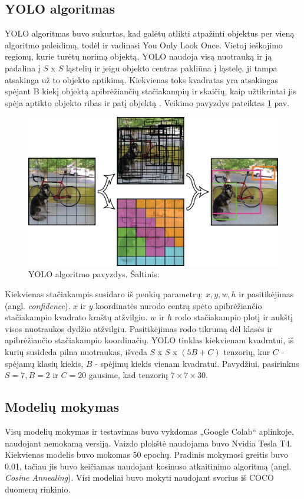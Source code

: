 \documentclass{VUMIFPSkursinis}
\begin{document}
\subsection{YOLO algoritmas}
YOLO algoritmas buvo sukurtas, kad galėtų atlikti atpažinti objektus per vieną algoritmo paleidimą, todėl ir vadinasi You Only Look Once. Vietoj ieškojimo regionų, kurie turėtų norimą objektą, YOLO naudoja visą nuotrauką ir ją padalina į $S$ x $S$ ląstelių ir jeigu objekto centras pakliūna į ląstelę, ji tampa atsakinga už to objekto aptikimą. Kiekvienas toks kvadratas yra atsakingas spėjant B kiekį objektą apibrėžiančių stačiakampių ir skaičių, kaip užtikrintai jis spėja aptikto objekto ribas ir patį objektą \cite{redmon2015you}. Veikimo pavyzdys pateiktas \ref{img:yoloalg.png} pav. 

\begin{figure}[H]
    \centering
    \includegraphics[width=1\textwidth]{img/yolo_algo.png}
    \caption{YOLO algoritmo pavyzdys. Šaltinis: \cite{redmon2015you}}
    \label{img:yoloalg.png}
\end{figure}

Kiekvienas stačiakampis susidaro iš penkių parametrų: $x, y, w, h$ ir pasitikėjimas (angl. \emph{confidence}). $x$ ir $y$ koordinatės nurodo centrą spėto apibrėžiančio stačiakampio kvadrato kraštų atžvilgiu. $w$ ir $h$ rodo stačiakampio plotį ir aukštį visos nuotraukos dydžio atžvilgiu. Pasitikėjimas rodo tikrumą dėl klasės ir apibrėžiančio stačiakampio koordinačių. YOLO tinklas kiekvienam kvadratui, iš kurių susideda pilna nuotraukas, išveda $S$ x $S$ x $(5B + C)$ tenzorių, kur $C$ - spėjamų klasių kiekis, $B$ - spėjimų kiekis vienam kvadratui. Pavydžiui, pasirinkus $S = 7, B = 2$ ir $C = 20$ gausime, kad tenzorių $7 × 7 × 30$.

\subsection{Modelių mokymas}
Visų modelių mokymas ir testavimas buvo vykdomas „Google Colab“ aplinkoje, naudojant nemokamą versiją. Vaizdo plokštė naudojama buvo Nvidia Tesla T4. Kiekvienas modelis buvo mokomas 50 epochų.  Pradinis mokymosi greitis buvo 0.01, tačiau jis buvo keičiamas naudojant kosinuso atkaitinimo algoritmą (angl. \emph{Cosine Annealing}). Visi modeliai buvo mokyti naudojant svorius iš COCO duomenų rinkinio.
\end{document}
